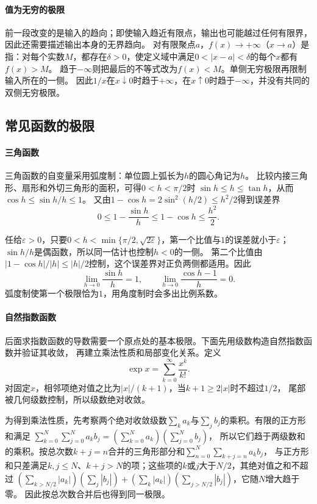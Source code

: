 \paragraph{值为无穷的极限}
前一段改变的是输入的趋向；即使输入趋近有限点，输出也可能越过任何有限界，因此还需要描述输出本身的无界趋向。
对有限聚点$a$，$f(x)\to+\infty$（$x\to a$）是指：对每个实数$M$，都存在$\delta>0$，使定义域中满足$0<|x-a|<\delta$的每个$x$都有$f(x)>M$。
趋于$-\infty$则把最后的不等式改为$f(x)<M$。单侧无穷极限再限制输入所在的一侧。
因此$1/x$在$x\downarrow0$时趋于$+\infty$，在$x\uparrow0$时趋于$-\infty$，并没有共同的双侧无穷极限。

\subsection{常见函数的极限}

\paragraph{三角函数}
三角函数的自变量采用弧度制：单位圆上弧长为$h$的圆心角记为$h$。
比较内接三角形、扇形和外切三角形的面积，可得$0<h<\pi/2$时
$\sin h\leq h\leq\tan h$，从而$\cos h\leq\sin h/h\leq1$。
又由$1-\cos h=2\sin^2(h/2)\leq h^2/2$得到误差界
\[
 0\leq1-\frac{\sin h}{h}\leq1-\cos h\leq\frac{h^2}{2}.
\]

任给$\varepsilon>0$，只要$0<h<\min\{\pi/2,\sqrt{2\varepsilon}\}$，第一个比值与$1$的误差就小于$\varepsilon$；
$\sin h/h$是偶函数，所以同一估计也控制$h<0$的一侧。
第二个比值由$|1-\cos h|/|h|\leq|h|/2$控制，这个误差界对正负两侧都适用。因此
\[
 \lim_{h\to0}\frac{\sin h}{h}=1,
 \qquad
 \lim_{h\to0}\frac{\cos h-1}{h}=0.
\]
弧度制使第一个极限恰为$1$，用角度制时会多出比例系数。

\paragraph{自然指数函数}
后面求指数函数的导数需要一个原点处的基本极限。下面先用级数构造自然指数函数并验证其收敛，
再建立乘法性质和局部变化关系。定义
\[
 \exp x=\sum_{k=0}^{\infty}\frac{x^k}{k!}.
\]
对固定$x$，相邻项绝对值之比为$|x|/(k+1)$，当$k+1\geq2|x|$时不超过$1/2$，
尾部被几何级数控制，所以级数绝对收敛。

为得到乘法性质，先考察两个绝对收敛级数$\sum_k a_k$与$\sum_j b_j$的乘积。有限的正方形和满足
$\sum_{k=0}^N\sum_{j=0}^Na_kb_j=(\sum_{k=0}^Na_k)(\sum_{j=0}^Nb_j)$，
所以它们趋于两级数和的乘积。按总次数$k+j=n$合并的三角形部分和$\sum_{n=0}^{N}\sum_{k+j=n}a_kb_j$，
与正方形和只差满足$k,j\leq N$、$k+j>N$的项；这些项的$k$或$j$大于$N/2$，其绝对值之和不超过
$(\sum_{k>N/2}|a_k|)(\sum_j|b_j|)+(\sum_k|a_k|)(\sum_{j>N/2}|b_j|)$，它随$N$增大趋于零。
因此按总次数合并后也得到同一极限。

